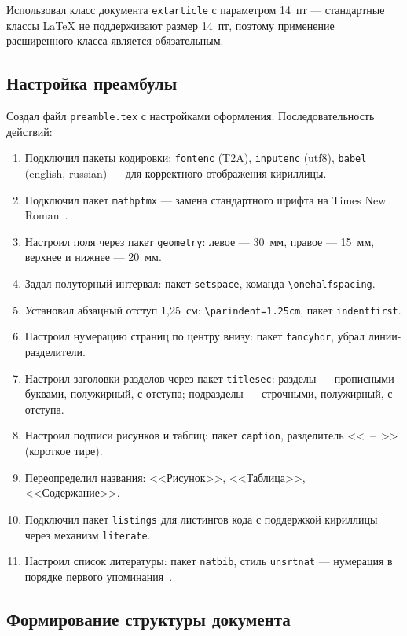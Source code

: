 \documentclass[a4paper,14pt]{extarticle}
\begin{document}
Использовал класс документа \texttt{extarticle} с параметром 14~пт --- стандартные классы \LaTeX{} не поддерживают размер 14~пт, поэтому применение расширенного класса является обязательным.

\subsection{Настройка преамбулы}

Создал файл \texttt{preamble.tex} с настройками оформления. Последовательность действий:

\begin{enumerate}
  \item Подключил пакеты кодировки: \texttt{fontenc} (T2A), \texttt{inputenc} (utf8), \texttt{babel} (english, russian) --- для корректного отображения кириллицы.
  \item Подключил пакет \texttt{mathptmx} --- замена стандартного шрифта на Times New Roman~\cite{kotelnikov2004}.
  \item Настроил поля через пакет \texttt{geometry}: левое --- 30~мм, правое --- 15~мм, верхнее и нижнее --- 20~мм.
  \item Задал полуторный интервал: пакет \texttt{setspace}, команда \texttt{\textbackslash onehalfspacing}.
  \item Установил абзацный отступ 1,25~см: \texttt{\textbackslash parindent=1.25cm}, пакет \texttt{indentfirst}.
  \item Настроил нумерацию страниц по центру внизу: пакет \texttt{fancyhdr}, убрал линии-разделители.
  \item Настроил заголовки разделов через пакет \texttt{titlesec}: разделы --- прописными буквами, полужирный, с отступа; подразделы --- строчными, полужирный, с отступа.
  \item Настроил подписи рисунков и таблиц: пакет \texttt{caption}, разделитель <<~--~>> (короткое тире).
  \item Переопределил названия: <<Рисунок>>, <<Таблица>>, <<Содержание>>.
  \item Подключил пакет \texttt{listings} для листингов кода с поддержкой кириллицы через механизм \texttt{literate}.
  \item Настроил список литературы: пакет \texttt{natbib}, стиль \texttt{unsrtnat} --- нумерация в порядке первого упоминания~\cite{gost71}.
\end{enumerate}

\subsection{Формирование структуры документа}
\end{document}
